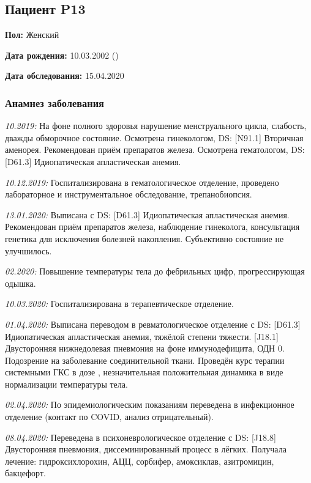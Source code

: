 \documentclass[a4paper,14pt]{extarticle}
\newcommand{\mg}{мг}
\newcommand{\pdate}[1]{\emph{#1:} }
\newcommand{\DS}[2]{[#2] #1}
\begin{document}
\newpage
\subsection*{Пациент P13}

\textbf{Пол:} Женский

\textbf{Дата рождения:} 10.03.2002 ()

\textbf{Дата обследования:} 15.04.2020

\subsubsection*{Анамнез заболевания}

\pdate{10.2019} На фоне полного здоровья нарушение менструального цикла, слабость, дважды обморочное состояние.
Осмотрена гинекологом, DS: \DS{Вторичная аменорея}{N91.1}. Рекомендован приём препаратов железа.
Осмотрена гематологом, DS: \DS{Идиопатическая апластическая анемия}{D61.3}.

\pdate{10.12.2019} Госпитализирована в гематологическое отделение, проведено лабораторное и инструментальное обследование, трепанобиопсия.

\pdate{13.01.2020} Выписана с DS: \DS{Идиопатическая апластическая анемия}{D61.3}. Рекомендован приём препаратов железа, наблюдение гинеколога, консультация генетика для исключения болезней накопления.
Субъективно состояние не улучшилось.

\pdate{02.2020} Повышение температуры тела до фебрильных цифр, прогрессирующая одышка.

\pdate{10.03.2020} Госпитализирована в терапевтическое отделение.

\pdate{01.04.2020} Выписана переводом в ревматологическое отделение с DS: \DS{Идиопатическая апластическая анемия, тяжёлой степени тяжести}{D61.3}. \DS{Двусторонняя нижнедолевая пневмония на фоне иммунодефицита, ОДН 0}{J18.1}. Подозрение на заболевание соединительной ткани.
Проведён курс терапии системными ГКС в дозе \numprint[\mg]{35}, незначительная положительная динамика в виде нормализации температуры тела.

\pdate{02.04.2020} По эпидемиологическим показаниям переведена в инфекционное отделение (контакт по COVID, анализ отрицательный).

\pdate{08.04.2020} Переведена в психоневрологическое отделение с DS: \DS{Двусторонняя пневмония, диссеминированный процесс в лёгких}{J18.8}.
Получала лечение: гидроксихлорохин, АЦЦ, сорбифер, амоксиклав, азитромицин, бакцефорт.
\end{document}
